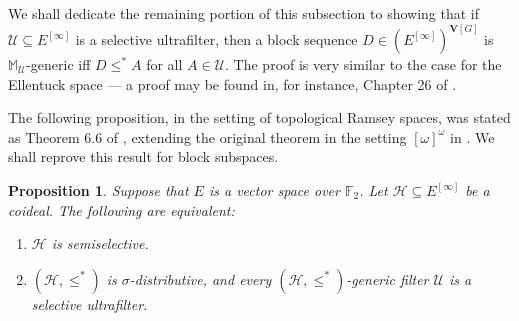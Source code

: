 \documentclass[11pt,reqno]{amsart}
\theoremstyle{plain}
\numberwithin{equation}{section}
\newtheorem{proposition}[theorem]{Proposition}
\theoremstyle{definition}
\newcommand{\cal}{\mathcal}
\renewcommand{\bf}{\mathbf}
\newcommand{\U}{\cal{U}}
\newcommand{\V}{\bf{V}}
\renewcommand{\H}{\cal{H}}
\begin{document}
We shall dedicate the remaining portion of this subsection to showing that if $\U \subseteq E^{[\infty]}$ is a selective ultrafilter, then a block sequence $D \in (E^{[\infty]})^{\V[G]}$ is $\mathbb{M}_\U$-generic iff $D \leq^* A$ for all $A \in \U$. The proof is very similar to the case for the Ellentuck space --- a proof may be found in, for instance, Chapter 26 of \cite{H22}.

The following proposition, in the setting of topological Ramsey spaces, was stated as Theorem 6.6 of \cite{DMN15}, extending the original theorem in the setting $[\omega]^\omega$ in \cite{F98}. We shall reprove this result for block subspaces.

\begin{proposition}
\label{prop:semiselective.adds.selective.ultrafilter}
    Suppose that $E$ is a vector space over $\mathbb{F}_2$. Let $\H \subseteq E^{[\infty]}$ be a coideal. The following are equivalent:
    \begin{enumerate}
        \item $\H$ is semiselective.
        
        \item $(\H,\leq^*)$ is $\sigma$-distributive, and every $(\H,\leq^*)$-generic filter $\U$ is a selective ultrafilter.
    \end{enumerate}
\end{proposition}
\end{document}
